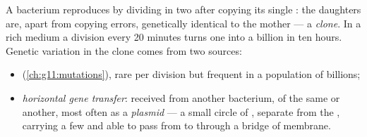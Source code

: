 \begin{proposition}\label{prop:g11:antibiotic-resistance:variation}
A bacterium reproduces by dividing in two after copying its single
: the daughters are, apart from copying errors, genetically
identical to the mother --- a \emph{clone}. In a rich medium a
division every 20 minutes turns one  into a billion in ten hours.
Genetic variation in the clone comes from two sources:
\begin{itemize}
  \item \emph{} (\cref{ch:g11:mutations}), rare per division
        but frequent in a population of billions;
  \item \emph{horizontal gene transfer}:
         received from another bacterium, of the same  or
        another, most often as a \emph{plasmid} --- a small circle of
        , separate from the , carrying a few  and
        able to pass from  to  through a bridge of membrane.
\end{itemize}
\end{proposition}
\admitted

